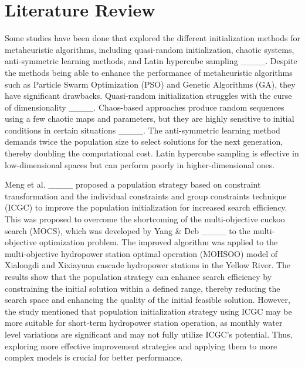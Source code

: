 \section{Literature Review}
Some studies have been done that explored the different initialization methods for metaheuristic algorithms, including quasi-random initialization, chaotic systems, anti-symmetric learning methods, and Latin hypercube sampling ____. Despite the methods being able to enhance the performance of metaheuristic algorithms such as Particle Swarm Optimization (PSO) and Genetic Algorithms (GA), they have significant drawbacks. Quasi-random initialization struggles with the curse of dimensionality ____. Chaos-based approaches produce random sequences using a few chaotic maps and parameters, but they are highly sensitive to initial conditions in certain situations ____. The anti-symmetric learning method demands twice the population size to select solutions for the next generation, thereby doubling the computational cost. Latin hypercube sampling is effective in low-dimensional spaces but can perform poorly in higher-dimensional ones.

Meng et al. ____ proposed a population strategy based on constraint transformation and the individual constraints and group constraints technique (ICGC) to improve the population initialization for increased search efficiency. This was proposed to overcome the shortcoming of the multi-objective cuckoo search (MOCS), which was developed by Yang \& Deb ____ to the multi-objective optimization problem. The improved algorithm was applied to the multi-objective hydropower station optimal operation (MOHSOO) model of Xialongdi and Xixiayuan cascade hydropower stations in the Yellow River. The results show that the population strategy can enhance search efficiency by constraining the initial solution within a defined range, thereby reducing the search space and enhancing the quality of the initial feasible solution. However, the study mentioned that population initialization strategy using ICGC may be more suitable for short-term hydropower station operation, as monthly water level variations are significant and may not fully utilize ICGC's potential. Thus, exploring more effective improvement strategies and applying them to more complex models is crucial for better performance.

